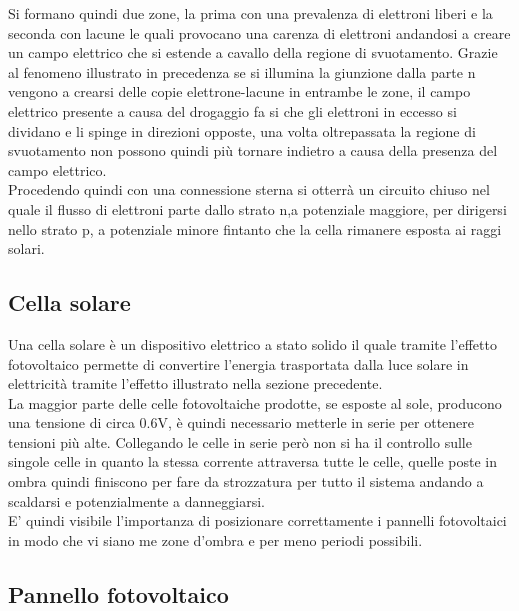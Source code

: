Si formano quindi due zone, la prima con una prevalenza di elettroni liberi e la seconda con lacune le quali provocano una carenza di elettroni andandosi a creare un campo elettrico che si estende a cavallo della regione di svuotamento. Grazie al fenomeno illustrato in precedenza se si illumina la giunzione dalla parte n vengono a crearsi delle copie elettrone-lacune in entrambe le zone, il campo elettrico presente a causa del drogaggio fa si che gli elettroni in eccesso si dividano e li spinge in direzioni opposte, una volta oltrepassata la regione di svuotamento non possono quindi più tornare indietro a causa della presenza del campo elettrico.\\
Procedendo quindi con una connessione sterna si otterrà un circuito chiuso nel quale il flusso di elettroni parte dallo strato n,a potenziale maggiore, per dirigersi nello strato p, a potenziale minore fintanto che la cella rimanere esposta ai raggi solari.\\
\subsection{Cella solare}
Una cella solare è un dispositivo elettrico a stato solido il quale tramite l'effetto fotovoltaico permette di convertire l'energia trasportata dalla luce solare in elettricità tramite l'effetto illustrato nella sezione precedente.\\
La maggior parte delle celle fotovoltaiche prodotte, se esposte al sole, producono una tensione di circa 0.6V, è quindi necessario metterle in serie per ottenere tensioni più alte. Collegando le celle in serie però non si ha il controllo sulle singole celle in quanto la stessa corrente attraversa tutte le celle, quelle poste in ombra quindi finiscono per fare da strozzatura per tutto il sistema andando a scaldarsi e potenzialmente a danneggiarsi.\\
E' quindi visibile l'importanza di posizionare correttamente i pannelli fotovoltaici in modo che vi siano me zone d'ombra e per meno periodi possibili.\\
\subsection{Pannello fotovoltaico}
